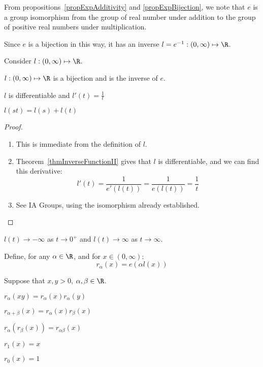 \documentclass[../Main.tex]{subfiles}
\begin{document}
From propositions~\ref{propExpAdditivity} and \ref{propExpBijection}, we note that $e$ is a group isomorphism from the group of real number under addition to the group of positive real numbers under multiplication.\par
Since $e$ is a bijection in this way, it has an inverse $l = e^{-1} : (0, \infty) \mapsto \R$.
\begin{propositions}{
        Consider $l : (0, \infty) \mapsto \R$.
        \label{propsLogRealProps}
    }
    \item $l : (0, \infty) \mapsto \R$ is a bijection and is the inverse of $e$. \label{propLogInverseOfExp}
    \item $l$ is differentiable and $l'(t) = \frac{1}{t}$ \label{propLogDerivative}
    \item $l(st) = l(s) + l(t)$ \label{propLogMultity}
\end{propositions}
\begin{proof}
    \begin{enumerate}
        \item This is immediate from the definition of $l$.
        \item Theorem~\ref{thmInverseFunctionII} gives that $l$ is differentiable, and we can find this derivative:
            \begin{equation*}
                l'(t) = \frac{1}{e'(l(t))} = \frac{1}{e(l(t))} = \frac{1}{t}
            \end{equation*}
        \item See IA Groups, using the isomorphism already established.
    \end{enumerate}
\end{proof}
\begin{remark}
    $l(t) \to -\infty$ as $t \to 0^+$ and $l(t) \to \infty$ as $t \to \infty$.
\end{remark}
Define, for any $\alpha \in \R$, and for $x \in (0, \infty)$:
\begin{equation*}
    r_{\alpha}(x) = e(\alpha l(x))
\end{equation*}
\begin{propositions}{
        Suppose that $x, y > 0$, $\alpha, \beta \in \R$.
        \label{propsPwrProps}
    }
    \item $r_\alpha(xy) = r_\alpha(x) r_\alpha(y)$ \label{propPrwMultiply}
    \item $r_{\alpha + \beta}(x) = r_\alpha(x)r_\beta(x)$ \label{propPwrSum}
    \item $r_\alpha(r_\beta(x)) = r_{\alpha\beta}(x)$ \label{propPwrChain}
    \item $r_1(x) = x$ \label{propPwr1Identity}
    \item $r_0(x) = 1$ \label{propPwrZero}
\end{propositions}
\end{document}
